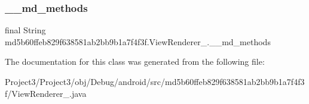 \subsubsection{\texorpdfstring{\+\_\+\+\_\+md\+\_\+methods}{\_\_md\_methods}}
{\footnotesize\ttfamily final String md5b60ffeb829f638581ab2bb9b1a7f4f3f.\+View\+Renderer\+\_.\+\_\+\+\_\+md\+\_\+methods\hspace{0.3cm}{\ttfamily [static]}}



The documentation for this class was generated from the following file\+:\begin{DoxyCompactItemize}
\item 
Project3/\+Project3/obj/\+Debug/android/src/md5b60ffeb829f638581ab2bb9b1a7f4f3f/View\+Renderer\+\_.\+java\end{DoxyCompactItemize}
